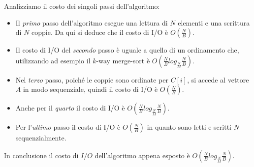 Analizziamo il costo dei singoli passi dell'algoritmo:
\begin{itemize}
    \item Il \emph{primo} passo dell'algoritmo esegue una lettura di \(N\) elementi
    e una scrittura di \(N\) coppie. Da qui si deduce che il costo di I/O è
    \(O\left(\frac{N}{B}\right)\).
    \item Il costo di I/O del \emph{secondo} passo è uguale a quello di un
    ordinamento che, utilizzando ad esempio il \(k\)-way merge-sort è
    \(O\left(\frac{N}{B}log_\frac{N}{M} \frac{N}{B}\right)\).
    \item Nel \emph{terzo} passo, poiché le coppie sono ordinate per \(C[i]\), si accede
    al vettore \(A\) in modo sequenziale, quindi il costo di I/O è \(O\left(\frac{N}{B}\right)\).
    \item Anche per il \emph{quarto} il costo di I/O è
    \(O\left(\frac{N}{B}log_\frac{N}{M} \frac{N}{B}\right)\).
    \item Per l'\emph{ultimo} passo il costo di I/O è \(O\left(\frac{N}{B}\right)\) in quanto
    sono letti e scritti \(N\) sequenzialmente.
\end{itemize}

In conclusione il costo di \(I/O\) dell'algoritmo appena esposto è
\(O\left(\frac{N}{B}log_\frac{N}{M} \frac{N}{B}\right)\).
